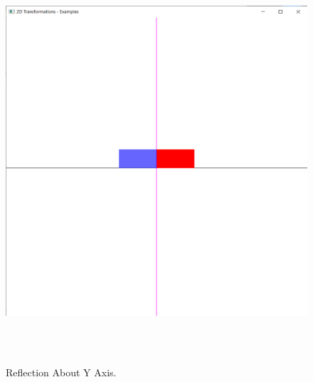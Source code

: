 \documentclass[12pt, a4]{article}
\begin{document}
\subsection*{}
\begin{figure}[h]
\centering
\caption{Reflection About Y Axis.}
\includegraphics[height=15cm, width=15cm]{Outputs/Output-6.png}
\end{figure}

\newpage
\end{document}
